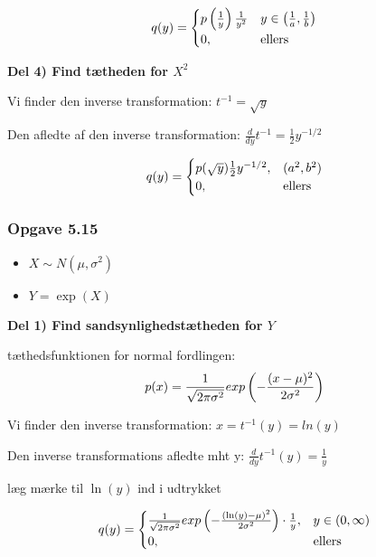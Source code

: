 \begin{equation}
    q(y) = 
    \begin{cases}
    p \left( \frac{1}{y} \right) \frac{1}{y^{2}} &y \in \left( \frac{1}{a}, \frac{1}{b}  \right) \\
    0, &\text{ellers}
    \end{cases}
\end{equation}

\textbf{Del 4) Find tætheden for $X^2$}

Vi finder den inverse transformation: $t^{-1} = \sqrt{y}$

Den afledte af den inverse transformation:
$\frac{d}{dy} t^{-1} = \frac{1}{2} y^{-1/2}$

\begin{equation}
    q(y) = 
    \begin{cases}
    p(\sqrt{y})\frac{1}{2} y^{-1/2}, &(a^2, b^2) \\
    0, &\text{ellers}
    \end{cases}
\end{equation}

\subsubsection{Opgave 5.15}

\begin{itemize}
    \item $X \sim N(\mu, \sigma^2)$
    \item $Y = \exp(X) $
\end{itemize}

\textbf{Del 1) Find sandsynlighedstætheden for $Y$}

tæthedsfunktionen for normal fordlingen:
\begin{equation}
    p(x) = \frac{1}{\sqrt{2 \pi \sigma^2}} exp \left( - \frac{(x-\mu)^{2}}{2\sigma^2} \right)
\end{equation}

Vi finder den inverse transformation: $x = t^{-1}(y) = ln(y)$

Den inverse transformations afledte mht y: $\frac{d}{dy} t^{-1}(y) = \frac{1}{y}$

læg mærke til $\ln(y)$ ind i udtrykket

\begin{equation}
    q(y) =
    \begin{cases}
         \frac{1}{\sqrt{2 \pi \sigma^2}} exp \left( - \frac{(\ln (y)-\mu)^{2}}{2\sigma^2} \right)  \cdot \frac{1}{y}, &y \in (0, \infty) \\
        0, & \text{ellers}
    \end{cases}
\end{equation}


